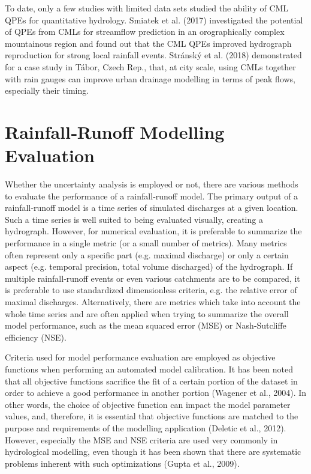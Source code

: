\documentclass{ctuthesis}\usepackage[]{graphicx}\usepackage[]{color}
\begin{document}
To date, only a few studies with limited data sets studied the ability of CML QPEs for quantitative hydrology. Smiatek et al. (2017) investigated the potential of QPEs from CMLs for streamflow prediction in an orographically complex mountainous region and found out that the CML QPEs improved hydrograph reproduction for strong local rainfall events. Stránský et al. (2018) demonstrated for a case study in Tábor, Czech Rep., that, at city scale, using CMLs together with rain gauges can improve urban drainage modelling in terms of peak flows, especially their timing.


\section{Rainfall‐Runoff Modelling Evaluation}

Whether the uncertainty analysis is employed or not, there are various methods to evaluate the
performance of a rainfall‐runoff model. The primary output of a rainfall‐runoff model is a time series
of simulated discharges at a given location. Such a time series is well suited to being evaluated
visually, creating a hydrograph. However, for numerical evaluation, it is preferable to summarize the
performance in a single metric (or a small number of metrics). Many metrics often represent only a
specific part (e.g. maximal discharge) or only a certain aspect (e.g. temporal precision, total volume
discharged) of the hydrograph. If multiple rainfall‐runoff events or even various catchments are to be
compared, it is preferable to use standardized dimensionless criteria, e.g. the relative error of
maximal discharges. Alternatively, there are metrics which take into account the whole time series
and are often applied when trying to summarize the overall model performance, such as the mean
squared error (MSE) or Nash‐Sutcliffe efficiency (NSE).

Criteria used for model performance evaluation are employed as objective functions when
performing an automated model calibration. It has been noted that all objective functions sacrifice
the fit of a certain portion of the dataset in order to achieve a good performance in another portion
(Wagener et al., 2004). In other words, the choice of objective function can impact the model
parameter values, and, therefore, it is essential that objective functions are matched to the purpose
and requirements of the modelling application (Deletic et al., 2012). However, especially the MSE
and NSE criteria are used very commonly in hydrological modelling, even though it has been shown
that there are systematic problems inherent with such optimizations (Gupta et al., 2009).
\end{document}
